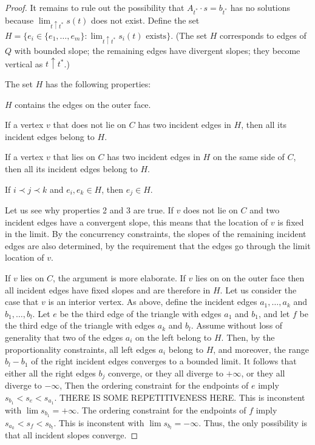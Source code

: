 \documentclass{patmorin}
\begin{document}
\begin{proof}
 It remains to rule out the possibility that
 $A_{t^*}\cdot s=b_{t^*}$ has no solutions because
   $\lim_{t\uparrow t^*} s(t)$ does not exist.  Define the set $H=\{e_i\in
   \{e_1,\ldots,e_m\}:\text{$\lim_{t\uparrow t^*} s_i(t)$ exists}\}$.
(The set $H$ corresponds to edges of $Q$
   with
   bounded slope; the remaining edges have divergent slopes; they
   become vertical as $t\uparrow t^*$.)
   \begin{prop}
The set   $H$ has the following
   properties:
   \begin{compactenum}
    \item $H$ contains the edges
      on the outer face.
    \item \label{off-C}
If a vertex $v$ that does not lie on $C$ has two incident edges in
$H$,
then all its incident edges belong to $H$.
    \item \label{on-C}
If a vertex $v$ that lies on $C$ has two incident edges in
$H$ on the same side of $C$,
then all its incident edges belong to $H$.
    \item If $i \prec j \prec k$ and $e_i,e_k\in H$, 
      then $e_j\in H$.
   \end{compactenum}
   \end{prop}
Let us see why properties 2 and 3 are true.
If $v$ does not lie on $C$ and two incident edges have a convergent
slope, this means that the location of $v$ is fixed in the limit.
By the concurrency constraints, the slopes of the remaining incident
edges are also determined, by the requirement that the edges go through
the limit location of $v$.

If $v$ lies on $C$, the argument is more elaborate. If $v$ lies on
on the outer face then all incident edges have fixed slopes and are therefore in
$H$.
Let us consider the case that $v$ is an interior vertex.
As above, define the incident edges $a_1,\ldots,a_k$ and $b_1,\ldots,b_l$.
Let $e$ be the third edge of the triangle with edges $a_1$ and $b_1$,
and let 
 $f$ be the third edge of the triangle with edges $a_k$ and $b_l$.
Assume without loss of generality that two of the edges $a_i$ on the
left belong to $H$. Then, by the proportionality constraints, all
left edges $a_i$ belong to $H$, and moreover, the range $b_l-b_1$ of
the right incident edges converges to a bounded limit.
It follows that either all the right edges $b_j$ converge, 
or they all diverge to $+\infty$,
or they all diverge to $-\infty$,
Then the ordering constraint for the endpoints of $e$ imply
\begin{math}
  s_{b_1}<s_e<s_{a_1}
\end{math}.
THERE IS SOME REPETITIVENESS HERE.
This is inconstent with $\lim s_{b_1}=+\infty$.
The ordering constraint for the endpoints of $f$ imply
\begin{math}
  s_{a_k}<s_f<s_{b_l}
\end{math}.
This is inconstent with $\lim s_{b_l}=-\infty$.
Thus, the only possibility is that all incident slopes converge.


\end{proof}
\end{document}
